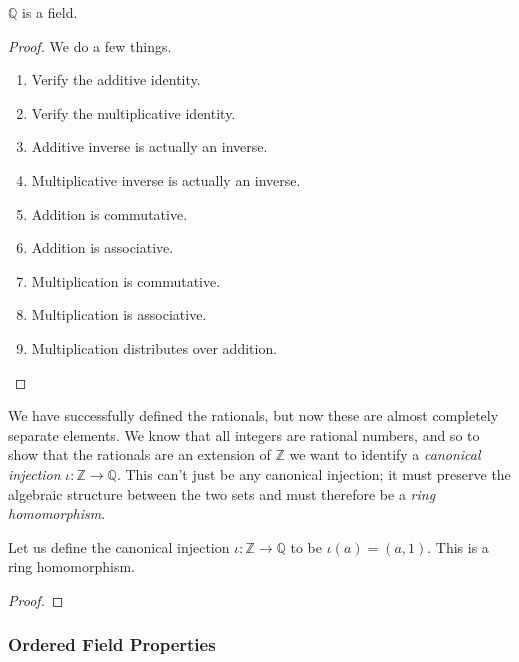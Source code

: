 \documentclass{article}
\begin{document}
      \begin{theorem}
        $\mathbb{Q}$ is a field. 
      \end{theorem} 
      \begin{proof}
        We do a few things. 
        \begin{enumerate}
          \item Verify the additive identity. 
          \item Verify the multiplicative identity. 
          \item Additive inverse is actually an inverse. 
          \item Multiplicative inverse is actually an inverse. 
          \item Addition is commutative. 
          \item Addition is associative. 
          \item Multiplication is commutative. 
          \item Multiplication is associative. 
          \item Multiplication distributes over addition. 
        \end{enumerate}
      \end{proof} 

      We have successfully defined the rationals, but now these are almost completely separate elements. We know that all integers are rational numbers, and so to show that the rationals are an extension of $\mathbb{Z}$ we want to identify a \textit{canonical injection} $\iota: \mathbb{Z} \rightarrow \mathbb{Q}$. This can't just be any canonical injection; it must preserve the algebraic structure between the two sets and must therefore be a \textit{ring homomorphism}. 

      \begin{theorem}
        Let us define the canonical injection $\iota: \mathbb{Z} \rightarrow \mathbb{Q}$ to be $\iota(a) = (a, 1)$. This is a ring homomorphism. 
      \end{theorem}
      \begin{proof}
        
      \end{proof} 

    \subsubsection{Ordered Field Properties} 
\end{document}
